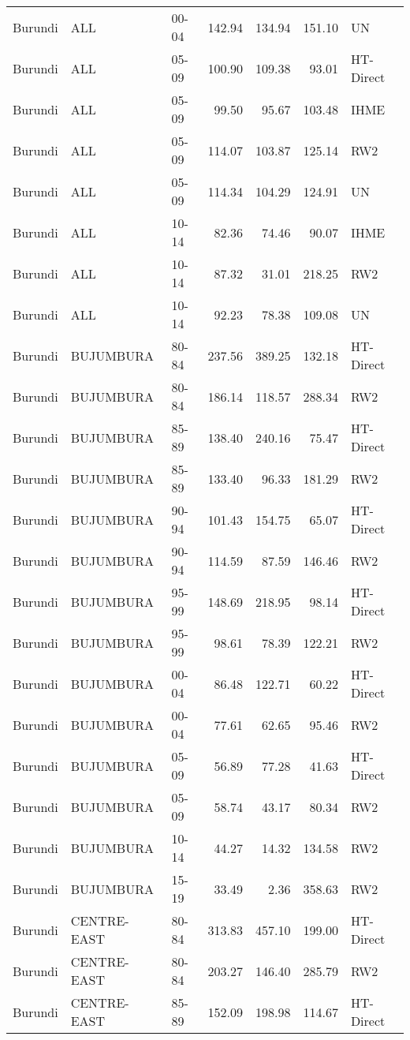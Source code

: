 \begin{longtable}{lllrrrl}
  Burundi & ALL & 00-04 & 142.94 & 134.94 & 151.10 & UN \\ 
  Burundi & ALL & 05-09 & 100.90 & 109.38 & 93.01 & HT-Direct \\ 
  Burundi & ALL & 05-09 & 99.50 & 95.67 & 103.48 & IHME \\ 
  Burundi & ALL & 05-09 & 114.07 & 103.87 & 125.14 & RW2 \\ 
  Burundi & ALL & 05-09 & 114.34 & 104.29 & 124.91 & UN \\ 
  Burundi & ALL & 10-14 & 82.36 & 74.46 & 90.07 & IHME \\ 
  Burundi & ALL & 10-14 & 87.32 & 31.01 & 218.25 & RW2 \\ 
  Burundi & ALL & 10-14 & 92.23 & 78.38 & 109.08 & UN \\ 
  Burundi & BUJUMBURA & 80-84 & 237.56 & 389.25 & 132.18 & HT-Direct \\ 
  Burundi & BUJUMBURA & 80-84 & 186.14 & 118.57 & 288.34 & RW2 \\ 
  Burundi & BUJUMBURA & 85-89 & 138.40 & 240.16 & 75.47 & HT-Direct \\ 
  Burundi & BUJUMBURA & 85-89 & 133.40 & 96.33 & 181.29 & RW2 \\ 
  Burundi & BUJUMBURA & 90-94 & 101.43 & 154.75 & 65.07 & HT-Direct \\ 
  Burundi & BUJUMBURA & 90-94 & 114.59 & 87.59 & 146.46 & RW2 \\ 
  Burundi & BUJUMBURA & 95-99 & 148.69 & 218.95 & 98.14 & HT-Direct \\ 
  Burundi & BUJUMBURA & 95-99 & 98.61 & 78.39 & 122.21 & RW2 \\ 
  Burundi & BUJUMBURA & 00-04 & 86.48 & 122.71 & 60.22 & HT-Direct \\ 
  Burundi & BUJUMBURA & 00-04 & 77.61 & 62.65 & 95.46 & RW2 \\ 
  Burundi & BUJUMBURA & 05-09 & 56.89 & 77.28 & 41.63 & HT-Direct \\ 
  Burundi & BUJUMBURA & 05-09 & 58.74 & 43.17 & 80.34 & RW2 \\ 
  Burundi & BUJUMBURA & 10-14 & 44.27 & 14.32 & 134.58 & RW2 \\ 
  Burundi & BUJUMBURA & 15-19 & 33.49 & 2.36 & 358.63 & RW2 \\ 
  Burundi & CENTRE-EAST & 80-84 & 313.83 & 457.10 & 199.00 & HT-Direct \\ 
  Burundi & CENTRE-EAST & 80-84 & 203.27 & 146.40 & 285.79 & RW2 \\ 
  Burundi & CENTRE-EAST & 85-89 & 152.09 & 198.98 & 114.67 & HT-Direct \\ 

\end{longtable}
